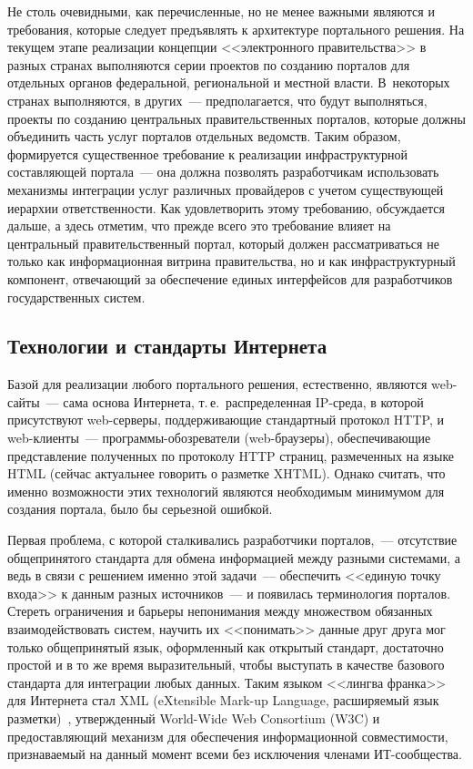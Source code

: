 \begin{multicols}{2}
Не столь очевидными, как перечисленные, но не менее важными являются и требования,
которые следует предъявлять к архитектуре портального решения. На текущем этапе
реализации концепции <<электронного правительства>> в разных странах выполняются
серии проектов по созданию порта\-лов для отдельных органов федеральной, региональной
и местной власти. В~не\-кото\-рых странах вы\-пол\-няют\-ся, в других~--- пред\-пола\-га\-ет\-ся, что \mbox{будут}
выпол\-нять\-ся, проекты по созда\-нию центральных правитель\-ст\-вен\-ных порталов, которые
должны объединить часть услуг  порталов отдель\-ных\linebreak
 ведомств. Таким образом,
формируется существенное требование к реализации инфраструктурной со\-став\-ля\-ющей
портала~--- она должна позволять разработчикам использовать механизмы интеграции
услуг различных провайдеров с учетом существующей иерархии ответственности. Как
удовлетворить этому требованию, обсуждается дальше, а здесь отметим, что прежде всего
это требование влияет на центральный правительственный портал, который должен
рассматриваться не только как информационная витрина правительства, но и как
инфраструктурный компонент, отвечающий за обеспечение единых интерфейсов для
разработчиков государственных систем.

\subsection{Технологии и стандарты Интернета} %

Базой для реализации любого портального реше\-ния, естественно, являются web-сай\-ты~---
\mbox{сама} основа Интернета, т.\,е.\ распределенная IP-сре\-да, в которой присутствуют
web-сер\-ве\-ры, под\-держи\-ва\-ющие стандартный протокол HTTP, и web-кли\-ен\-ты~---
про\-грам\-мы-обо\-зре\-ва\-те\-ли (web-брау\-зе\-ры), обеспечивающие представление полученных по
протоколу HTTP страниц, размеченных на языке HTML (сейчас актуальнее говорить о
разметке XHTML). Однако считать, что именно возможности этих технологий являются
необходимым минимумом для создания портала, было бы серьезной ошибкой.

Первая проблема, с которой сталкивались разработчики порталов,~--- отсутствие
общепринятого стандарта для обмена информацией между разными системами, а ведь в
связи с решением именно этой задачи~--- обеспечить <<единую точку входа>> к данным
разных источников~--- и появилась тер\-ми\-но\-логия порталов. Стереть ограничения и
барь\-е\-ры непо\-ни\-ма\-ния между множеством обязанных взаимодействовать систем, научить
их <<понимать>> данные друг друга мог только общепринятый язык, оформленный как
открытый стандарт, достаточно простой и в то же время выразительный, чтобы выступать
в качестве базового стандарта для интеграции любых данных. Таким языком <<лингва
франка>> для Интернета стал XML (eXtensible Mark-up Language, расширяемый язык
разметки)~\cite{7bos}, утверж\-денный  World-Wide Web Consortium (W3C) и
предостав\-ля\-ющий механизм для обеспечения информационной совместимости,
признаваемый на данный момент всеми без исключения членами ИТ-со\-об\-ще\-ст\-ва.


\end{multicols}
